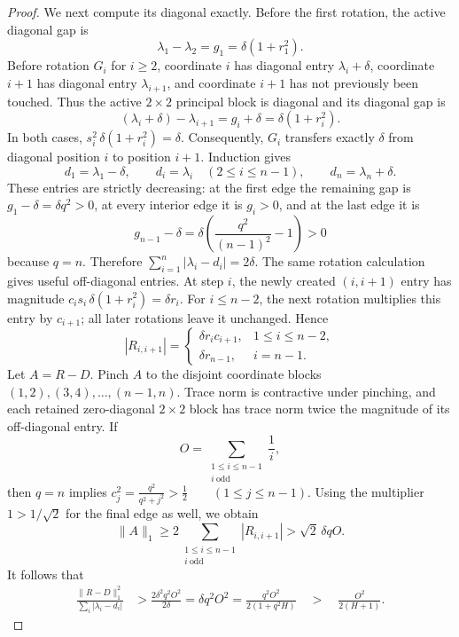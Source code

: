 \begin{cxrefutation}
\begin{proof}
We next compute its diagonal exactly.  Before the first rotation, the active
diagonal gap is
\[
  \lambda_1-\lambda_2=g_1=\delta(1+r_1^2).
\]
Before rotation $G_i$ for $i\geq2$, coordinate $i$ has diagonal entry
$\lambda_i+\delta$, coordinate $i+1$ has diagonal entry $\lambda_{i+1}$,
and coordinate $i+1$ has not previously been touched.  Thus the active
$2\times2$ principal block is diagonal and its diagonal gap is
\[
  (\lambda_i+\delta)-\lambda_{i+1}
  =g_i+\delta
  =\delta(1+r_i^2).
\]
In both cases, $s_i^2\,\delta(1+r_i^2)=\delta$. Consequently, $G_i$ transfers exactly $\delta$ from diagonal position $i$ to
position $i+1$.  Induction gives
\[
  d_1=\lambda_1-\delta,
  \qquad
  d_i=\lambda_i\quad(2\leq i\leq n-1),
  \qquad
  d_n=\lambda_n+\delta.
\]
These entries are strictly decreasing: at the first edge the remaining gap is
$g_1-\delta=\delta q^2>0$, at every interior edge it is $g_i>0$, and at the
last edge it is
\[
  g_{n-1}-\delta
  =\delta\left(\frac{q^2}{(n-1)^2}-1\right)>0
\]
because $q=n$.  Therefore $\sum_{i=1}^n|\lambda_i-d_i|=2\delta$.
The same rotation calculation gives useful off-diagonal entries.  At
step $i$, the newly created $(i,i+1)$ entry has magnitude $c_is_i\,\delta(1+r_i^2)=\delta r_i$. For $i\leq n-2$, the next rotation multiplies this entry by $c_{i+1}$; all
later rotations leave it unchanged.  Hence
\[
  |R_{i,i+1}|=
  \begin{cases}
    \delta r_i c_{i+1},&1\leq i\leq n-2,\\
    \delta r_{n-1},&i=n-1.
  \end{cases}
\]
Let $A=R-D$.  Pinch $A$ to the disjoint coordinate blocks
$(1,2),(3,4),\ldots,(n-1,n)$.  Trace norm is contractive under pinching, and
each retained zero-diagonal $2\times2$ block has trace norm twice the magnitude
of its off-diagonal entry.  If
\[
  O=\sum_{\substack{1\leq i\leq n-1\\ i\ \mathrm{odd}}}\frac1i,
\]
then $q=n$ implies $c_j^2=\frac{q^2}{q^2+j^2}>\frac12 \qquad(1\leq j\leq n-1)$. Using the multiplier $1>1/\sqrt2$ for the final edge as well, we obtain
\[
  \lVert A\rVert_1
  \geq 2\sum_{\substack{1\leq i\leq n-1\\ i\ \mathrm{odd}}}|R_{i,i+1}|
  >\sqrt2\,\delta q O.
\]
It follows that
\[
\begin{aligned}
  \frac{\lVert R-D\rVert_1^2}
       {\sum_i|\lambda_i-d_i|}
  &>\frac{2\delta^2q^2O^2}{2\delta}
    =\delta q^2O^2
    =\frac{q^2O^2}{2(1+q^2H)}\quad>\quad\frac{O^2}{2(H+1)}.
\end{aligned}
\]


\end{proof}
\end{cxrefutation}

